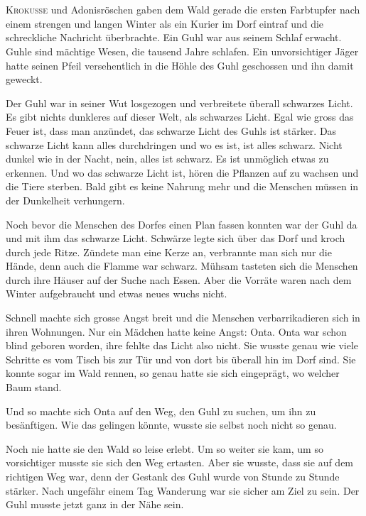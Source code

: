 \chapter*{}
\lettrine[lines=3]{\color{red}K}{rokusse} und Adonisröschen gaben dem Wald gerade die ersten Farbtupfer nach einem strengen  und langen Winter als ein Kurier im Dorf eintraf und die schreckliche Nachricht überbrachte. Ein Guhl war aus seinem Schlaf erwacht. Guhle sind mächtige Wesen, die tausend Jahre schlafen. Ein unvorsichtiger Jäger hatte seinen Pfeil versehentlich in die Höhle des Guhl geschossen und ihn damit geweckt.

Der Guhl war in seiner Wut losgezogen und verbreitete überall schwarzes Licht. Es gibt nichts dunkleres auf dieser Welt, als schwarzes Licht. Egal wie gross das Feuer ist, dass man anzündet, das schwarze Licht des Guhls ist stärker. Das schwarze Licht kann alles durchdringen und wo es ist, ist alles schwarz. Nicht dunkel wie in der Nacht, nein, alles ist schwarz. Es ist unmöglich etwas zu erkennen. Und wo das schwarze Licht ist, hören die Pflanzen auf zu wachsen und die Tiere sterben. Bald gibt es keine Nahrung mehr und die Menschen müssen in der Dunkelheit verhungern.

Noch bevor die Menschen des Dorfes einen Plan fassen konnten war der Guhl da und mit ihm das schwarze Licht. Schwärze legte sich über das Dorf und kroch durch jede Ritze. Zündete man eine Kerze an, verbrannte man sich nur die Hände, denn auch die Flamme war schwarz. Mühsam tasteten sich die Menschen durch ihre Häuser auf der Suche nach Essen. Aber die Vorräte waren nach dem Winter aufgebraucht und etwas neues wuchs nicht.

Schnell machte sich grosse Angst breit und die Menschen verbarrikadieren sich in ihren Wohnungen. Nur ein Mädchen hatte keine Angst: Onta. Onta war schon blind geboren worden, ihre fehlte das Licht also nicht. Sie wusste genau wie viele Schritte es vom Tisch bis zur Tür und von dort bis überall hin im Dorf sind. Sie konnte sogar im Wald rennen, so genau hatte sie sich eingeprägt, wo welcher Baum stand.

Und so machte sich Onta auf den Weg, den Guhl zu suchen, um ihn zu besänftigen. Wie das gelingen könnte, wusste sie selbst noch nicht so genau. 

Noch nie hatte sie den Wald so leise erlebt. Um so weiter sie kam, um so vorsichtiger musste sie sich den Weg ertasten. Aber sie wusste, dass sie auf dem richtigen Weg war, denn der Gestank des Guhl wurde von Stunde zu Stunde stärker. Nach ungefähr einem Tag Wanderung war sie sicher am Ziel zu sein. Der Guhl musste jetzt ganz in der Nähe sein.

